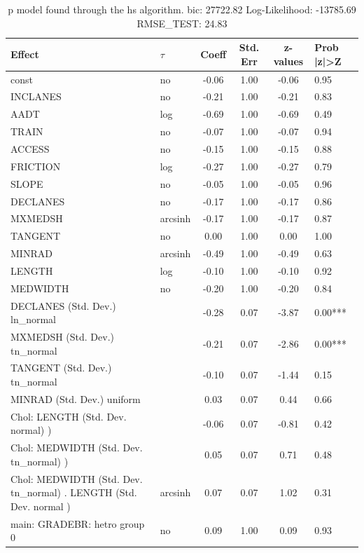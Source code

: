 \begin{table}
	\caption{p model found through the hs algorithm. bic: 27722.82 Log-Likelihood: -13785.69 RMSE_TEST: 24.83}
	\begin{center}
		\begin{tabular}{|l|l|c|c|c|l|}
			\hline
			Effect & $\tau$ & Coeff & Std. Err & z-values & Prob |z|>Z \\
			\hline
			const & no & -0.06 & 1.00 & -0.06 & 0.95 \\
			\hline
			INCLANES & no & -0.21 & 1.00 & -0.21 & 0.83 \\
			\hline
			AADT & log & -0.69 & 1.00 & -0.69 & 0.49 \\
			\hline
			TRAIN & no & -0.07 & 1.00 & -0.07 & 0.94 \\
			\hline
			ACCESS & no & -0.15 & 1.00 & -0.15 & 0.88 \\
			\hline
			FRICTION & log & -0.27 & 1.00 & -0.27 & 0.79 \\
			\hline
			SLOPE & no & -0.05 & 1.00 & -0.05 & 0.96 \\
			\hline
			DECLANES & no & -0.17 & 1.00 & -0.17 & 0.86 \\
			\hline
			MXMEDSH & arcsinh & -0.17 & 1.00 & -0.17 & 0.87 \\
			\hline
			TANGENT & no & 0.00 & 1.00 & 0.00 & 1.00 \\
			\hline
			MINRAD & arcsinh & -0.49 & 1.00 & -0.49 & 0.63 \\
			\hline
			LENGTH & log & -0.10 & 1.00 & -0.10 & 0.92 \\
			\hline
			MEDWIDTH & no & -0.20 & 1.00 & -0.20 & 0.84 \\
			\hline
			DECLANES (Std. Dev.) ln_normal &  & -0.28 & 0.07 & -3.87 & 0.00*** \\
			\hline
			MXMEDSH (Std. Dev.) tn_normal &  & -0.21 & 0.07 & -2.86 & 0.00*** \\
			\hline
			TANGENT (Std. Dev.) tn_normal &  & -0.10 & 0.07 & -1.44 & 0.15 \\
			\hline
			MINRAD (Std. Dev.) uniform &  & 0.03 & 0.07 & 0.44 & 0.66 \\
			\hline
			 Chol: LENGTH (Std. Dev. normal) ) &  & -0.06 & 0.07 & -0.81 & 0.42 \\
			\hline
			 Chol: MEDWIDTH (Std. Dev. tn_normal) ) &  & 0.05 & 0.07 & 0.71 & 0.48 \\
			\hline
			 Chol: MEDWIDTH (Std. Dev. tn_normal) . LENGTH (Std. Dev.   normal ) & arcsinh & 0.07 & 0.07 & 1.02 & 0.31 \\
			\hline
			main: GRADEBR: hetro group 0 & no & 0.09 & 1.00 & 0.09 & 0.93 \\

\end{tabular}
\end{center}
\end{table}
